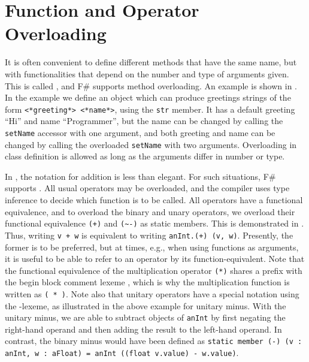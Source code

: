 \documentclass[fsharpNotes.tex]{subfiles}
\begin{document}
\section{Function and Operator Overloading}
It is often convenient to define different methods that have the same name, but with functionalities that depend on the number and type of arguments given. This is called , and F\# supports method overloading. An example is shown in .
%
% 
In the example we define an object which can produce greetings strings of the form \lstinline[language=syntax]{<*greeting*> <*name*>}, using the \lstinline{str} member. It has a default greeting ``Hi'' and name ``Programmer'', but the name can be changed by calling the \lstinline{setName} accessor with one argument, and both greeting and name can be changed by calling the overloaded \lstinline{setName} with two arguments. Overloading in class definition is allowed as long as the arguments differ in number or type.

In , the notation for addition is less than elegant. For such situations, F\# supports . All usual operators may be overloaded, and the compiler uses type inference to decide which function is to be called. All operators have a functional equivalence, and to overload the binary \lexeme{+} and unary \lexeme{-} operators, we overload their functional equivalence \lstinline{(+)} and \lstinline{(~-)} as static members. This is demonstrated in .
%
% 
Thus, writing \lstinline{v + w} is equivalent to writing \lstinline{anInt.(+) (v, w)}. Presently, the former is to be preferred, but at times, e.g., when using functions as arguments, it is useful to be able to refer to an operator by its function-equivalent. Note that the functional equivalence of the multiplication operator \lstinline{(*)} shares a  prefix with the begin block comment lexeme \lexeme{(*}, which is why the multiplication function is written as \lstinline{( * )}. Note also that unitary operators have a special notation using the \lexeme{\~}-lexeme, as illustrated in the above example for unitary minus. With the unitary minus, we are able to subtract objects of \lstinline{anInt} by first negating the right-hand operand and then adding the result to the left-hand operand. In contrast, the binary minus would have been defined as \lstinline{static member (-) (v : anInt, w : aFloat) = anInt ((float v.value) - w.value)}.
\end{document}

